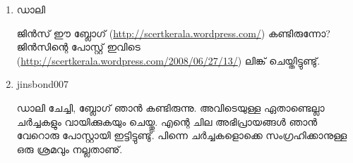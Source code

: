 \begin{enumerate}
 \item{ഡാലി}

ജിന്‍സ് ഈ ബ്ലോഗ് (\url{http://scertkerala.wordpress.com/}) കണ്ടിരുന്നോ?  ജിന്‍സിന്റെ പോസ്റ്റ് 
ഇവിടെ (\url{http://scertkerala.wordpress.com/2008/06/27/13/}) ലിങ്ക് ചെയ്തിട്ടുണ്ടു്.
\item{jinsbond007}

ഡാലി ചേച്ചി, ബ്ലോഗ് ഞാന്‍ കണ്ടിരുന്നു. അവിടെയുള്ള ഏതാണ്ടെല്ലാ ചര്‍ച്ചകളും വായിക്കുകയും ചെയ്തു. 
എന്റെ ചില അഭിപ്രായങ്ങള്‍ ഞാന്‍ വേറൊരു പോസ്റ്റായി ഇട്ടിട്ടുണ്ടു്. പിന്നെ ചര്‍ച്ചകളൊക്കെ സംഗ്രഹിക്കാനുള്ള 
ഒരു ശ്രമവും നല്ലതാണു്.

\end{enumerate}

\newpage
